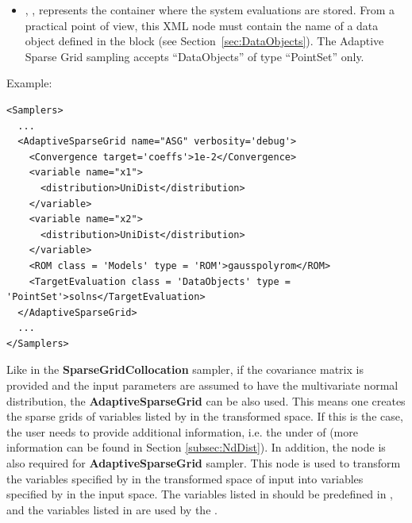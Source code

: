         \begin{itemize}
      \item {}, ,
        represents the container where the system evaluations are stored.
        From a practical point of view, this XML node must contain the name of
        a data object defined in the  block (see
        Section~\ref{sec:DataObjects}).
        The Adaptive Sparse Grid sampling accepts ``DataObjects'' of type
        ``PointSet'' only.
\end{itemize}

Example:
\begin{lstlisting}[style=XML,morekeywords={class,limit,subGridTol,weight,persistence}]
<Samplers>
  ...
  <AdaptiveSparseGrid name="ASG" verbosity='debug'>
    <Convergence target='coeffs'>1e-2</Convergence>
    <variable name="x1">
      <distribution>UniDist</distribution>
    </variable>
    <variable name="x2">
      <distribution>UniDist</distribution>
    </variable>
    <ROM class = 'Models' type = 'ROM'>gausspolyrom</ROM>
    <TargetEvaluation class = 'DataObjects' type = 'PointSet'>solns</TargetEvaluation>
  </AdaptiveSparseGrid>
  ...
</Samplers>
\end{lstlisting}

Like in the \textbf{SparseGridCollocation} sampler, if the covariance matrix is provided
and the input parameters are assumed to have the multivariate normal distribution, the \textbf{AdaptiveSparseGrid} can be also used.
This means one creates the sparse grids of variables listed by  in the transformed space. If this is
the case, the user needs to provide additional information, i.e. the  under 
of  (more information can be found in Section \ref{subsec:NdDist}). In addition, the node
 is also required for \textbf{AdaptiveSparseGrid} sampler. This node is used to transform
the variables specified by  in the transformed space of input into variables specified by
 in the input space. The variables listed in  should be predefined
in , and the variables listed in 
are used by the .

